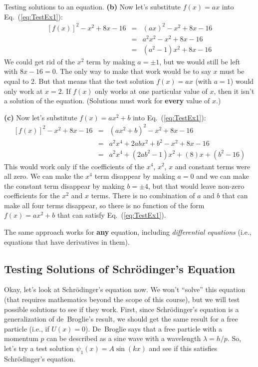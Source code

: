 \begin{example}{Testing solutions to an equation.}
{\bf (b)} Now let's substitute $f(x) = ax$ into Eq.~(\ref{eq:TestEx1}):
\begin{eqnarray}
\left[f(x)\right]^2-x^2+8x-16 & = & (ax)^2-x^2+8x-16 \nonumber \\
& = & a^2x^2-x^2+8x-16 \nonumber \\
& = & (a^2-1)x^2+8x-16 \nonumber
\end{eqnarray}
We could get rid of the $x^2$ term by making $a = \pm 1$, but we would still
be left with $8x - 16 = 0$. The only way to make that work would be to say
$x$ must be equal to 2. But that means that the test solution $f(x) = ax$
(with $a = 1$) would only work at $x = 2$. If $f(x)$ only works at
one particular value of $x$, then it isn't a solution of the equation.
(Solutions must work for {\bf every} value of $x$.)

{\bf (c)} Now let's substitute $f(x) = ax^2+b$ into Eq.~(\ref{eq:TestEx1}):
\begin{eqnarray}
\left[f(x)\right]^2-x^2+8x-16 & = & (ax^2+b)^2-x^2+8x-16 \nonumber \\
& = & a^2x^4+2abx^2+b^2-x^2+8x-16 \nonumber \\
& = & a^2x^4+(2ab^2-1)x^2+ (8)x +(b^2-16) \nonumber
\end{eqnarray}
This would work only if the coefficients of the $x^4$, $x^2$, $x$ and
constant terms were all zero. We can make the $x^4$ term disappear by
making $a=0$ and we can make the constant term disappear by making 
$b=\pm 4$, but that would leave non-zero coefficients for the
$x^2$ and $x$ terms. There is no combination of $a$ and $b$ that can
make all four terms disappear, so there is no function of the form
$f(x) = ax^2+b$ that can satisfy Eq.~(\ref{eq:TestEx1}).

\end{example}

The same approach works for {\bf any} equation, including {\it differential
equations} (i.e., equations that have derivatives in them).

\subsection{Testing Solutions of Schr\"odinger's Equation}
\label{sec:test_Solution}

Okay, let's look at Schr\"odinger's equation now. We won't ``solve'' this
equation (that requires mathematics beyond the scope of this course),
but we will test possible solutions to see if they work. First, since
Schr\"odinger's equation is a generalization of de~Broglie's result,
we should get the same result for a free particle (i.e., if $U(x)=0$).
De~Broglie says that a free particle with a momentum $p$ can be described
as a sine wave with a wavelength $\lambda=h/p$. So, let's try a test
solution $\psi_1(x)=A\sin(kx)$ and see if this satisfies Schr\"odinger's
equation.

